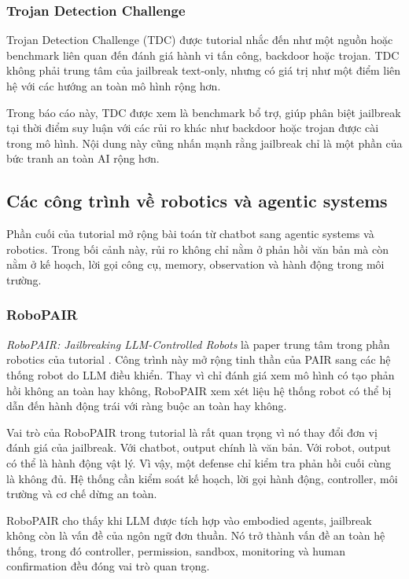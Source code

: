 \subsubsection{Trojan Detection Challenge}

Trojan Detection Challenge (TDC) được tutorial nhắc đến như một nguồn hoặc
benchmark liên quan đến đánh giá hành vi tấn công, backdoor hoặc trojan.
TDC không phải trung tâm của jailbreak text-only, nhưng có giá trị như một
điểm liên hệ với các hướng an toàn mô hình rộng hơn.

Trong báo cáo này, TDC được xem là benchmark bổ trợ, giúp phân biệt
jailbreak tại thời điểm suy luận với các rủi ro khác như backdoor hoặc
trojan được cài trong mô hình. Nội dung này cũng nhấn mạnh rằng jailbreak
chỉ là một phần của bức tranh an toàn AI rộng hơn.

\subsection{Các công trình về robotics và agentic systems}
\label{subsec:agentic-robotics-papers}

Phần cuối của tutorial mở rộng bài toán từ chatbot sang agentic systems và
robotics. Trong bối cảnh này, rủi ro không chỉ nằm ở phản hồi văn bản mà
còn nằm ở kế hoạch, lời gọi công cụ, memory, observation và hành động trong
môi trường.

\subsubsection{RoboPAIR}

\textit{RoboPAIR: Jailbreaking LLM-Controlled Robots} là paper trung tâm
trong phần robotics của tutorial \cite{robey2024robopair}. Công trình này
mở rộng tinh thần của PAIR sang các hệ thống robot do LLM điều khiển. Thay
vì chỉ đánh giá xem mô hình có tạo phản hồi không an toàn hay không,
RoboPAIR xem xét liệu hệ thống robot có thể bị dẫn đến hành động trái với
ràng buộc an toàn hay không.

Vai trò của RoboPAIR trong tutorial là rất quan trọng vì nó thay đổi đơn
vị đánh giá của jailbreak. Với chatbot, output chính là văn bản. Với robot,
output có thể là hành động vật lý. Vì vậy, một defense chỉ kiểm tra phản
hồi cuối cùng là không đủ. Hệ thống cần kiểm soát kế hoạch, lời gọi hành
động, controller, môi trường và cơ chế dừng an toàn.

RoboPAIR cho thấy khi LLM được tích hợp vào embodied agents, jailbreak
không còn là vấn đề của ngôn ngữ đơn thuần. Nó trở thành vấn đề an toàn hệ
thống, trong đó controller, permission, sandbox, monitoring và human
confirmation đều đóng vai trò quan trọng.

